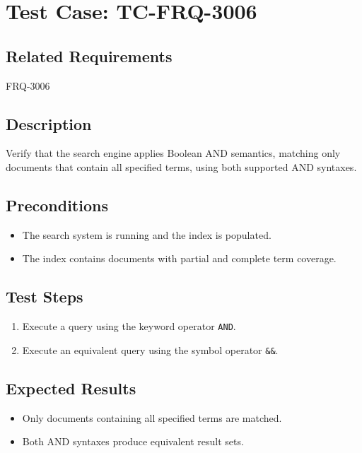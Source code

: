 \documentclass{article}
\begin{document}
\section{Test Case: TC-FRQ-3006}

\subsection*{Related Requirements}
FRQ-3006

\subsection*{Description}
Verify that the search engine applies Boolean AND semantics, matching only documents that contain all specified terms, using both supported AND syntaxes.

\subsection*{Preconditions}
\begin{itemize}
    \item The search system is running and the index is populated.
    \item The index contains documents with partial and complete term coverage.
\end{itemize}

\subsection*{Test Steps}
\begin{enumerate}
    \item Execute a query using the keyword operator \texttt{AND}.
    \item Execute an equivalent query using the symbol operator \texttt{\&\&}.
\end{enumerate}

\subsection*{Expected Results}
\begin{itemize}
    \item Only documents containing all specified terms are matched.
    \item Both AND syntaxes produce equivalent result sets.
\end{itemize}


\end{document}
